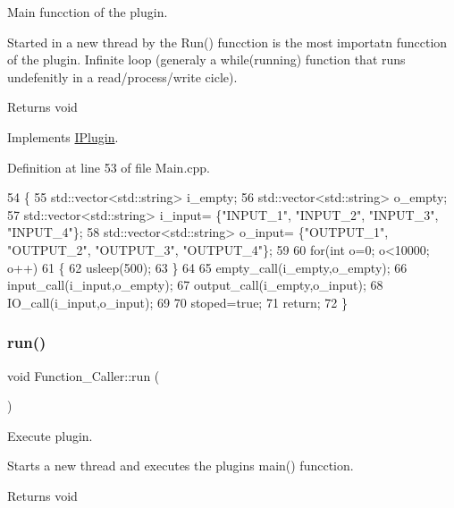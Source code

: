 Main funcction of the plugin. 

Started in a new thread by the Run() funcction is the most importatn funcction of the plugin. Infinite loop (generaly a while(running) function that runs undefenitly in a read/process/write cicle). \begin{DoxyReturn}{Returns}
void 
\end{DoxyReturn}


Implements \hyperlink{class_i_plugin_ab5fdb3b0f7afdcee04324dca01766749}{I\+Plugin}.



Definition at line 53 of file Main.\+cpp.


\begin{DoxyCode}
54 \{
55     std::vector<std::string> i\_empty;
56     std::vector<std::string> o\_empty;
57     std::vector<std::string> i\_input= \{\textcolor{stringliteral}{"INPUT\_1"}, \textcolor{stringliteral}{"INPUT\_2"}, \textcolor{stringliteral}{"INPUT\_3"}, \textcolor{stringliteral}{"INPUT\_4"}\};
58     std::vector<std::string> o\_input= \{\textcolor{stringliteral}{"OUTPUT\_1"}, \textcolor{stringliteral}{"OUTPUT\_2"}, \textcolor{stringliteral}{"OUTPUT\_3"}, \textcolor{stringliteral}{"OUTPUT\_4"}\};
59     
60     \textcolor{keywordflow}{for}(\textcolor{keywordtype}{int} o=0; o<10000; o++)
61     \{
62         usleep(500);
63     \}
64     
65     empty\_call(i\_empty,o\_empty);
66     input\_call(i\_input,o\_empty);
67     output\_call(i\_empty,o\_input);
68     IO\_call(i\_input,o\_input);
69 
70     stoped=\textcolor{keyword}{true};
71     \textcolor{keywordflow}{return};
72 \}
\end{DoxyCode}
\mbox{\label{class_function___caller_a508165a2fab0cb3f77d89135994f342d}} 
\subsubsection{\texorpdfstring{run()}{run()}}
{\footnotesize\ttfamily void Function\+\_\+\+Caller\+::run (\begin{DoxyParamCaption}{ }\end{DoxyParamCaption})\hspace{0.3cm}{\ttfamily [virtual]}}



Execute plugin. 

Starts a new thread and executes the plugins main() funcction. \begin{DoxyReturn}{Returns}
void 
\end{DoxyReturn}


